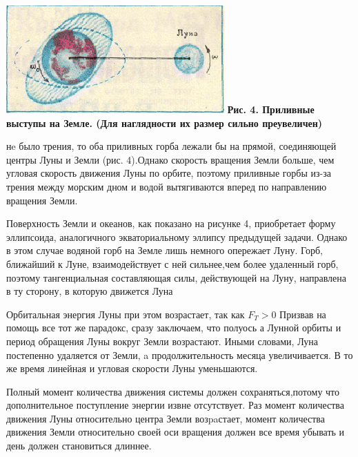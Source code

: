\leftskip=0.3cm \rightskip=1cm
\begin{minipage}{8cm}
	
	\includegraphics{img/picture4.png}
	\fontsize{10}{8}\selectfont
	\textbf{Рис. 4. Приливные выступы на Земле. (Для наглядности их размер сильно преувеличен)}
	
	\fontsize{14}{10}\selectfont
	нe было трения, то оба приливных горба лежали бы на прямой, соединяющей центры Луны и Земли (рис. 4).Однако скорость вращения Земли больше, чем угловая скорость движения Луны по орбите, поэтому приливные горбы из-за трения между морским дном и водой вытягиваются вперед по направлению вращения Земли.
	
	\hspace{10mm}Поверхность Земли и океанов, как показано на рисунке 4, приобретает форму эллипсоида, аналогичного экваториальному эллипсу предыдущей	задачи. Однако в этом случае водяной горб на Земле лишь немного опережает Луну. Горб, ближайший к Луне, взаимодействует с ней сильнее,чем более удаленный горб, поэтому	тангенциальная составляющая силы, действующей на Луну, направлена в ту сторону, в которую движется Луна
		
	\hspace{10mm}Орбитальная энергия Луны при этом возрастает, так как $F_T > 0$ Призвав на помощь все тот же парадокс, сразу заключаем, что полуось а Лунной орбиты и период обращения Луны вокруг Земли возрастают. Иными словами, Луна постепенно удаляется от Земли, a продолжительность месяца увеличивается. В то же время линейная и угловая скорости Луны уменьшаются.
	
	\hspace{10mm}Полный момент количества движения системы должен сохраняться,потому что дополнительное поступление энергии извне отсутствует. Раз момент количества движения Луны относительно центра Земли возpaстает, момент количества движения Земли относительно своей оси вращения должен все время убывать и день должен становиться длиннее.	
\end{minipage}